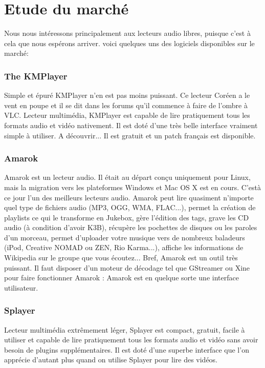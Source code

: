 \documentclass[12pt,a4paper]{report}
\begin{document}
\section{Etude du marché}
Nous nous intéressons principalement aux lecteurs audio libres, puisque c'est à cela que nous espérons arriver. voici quelques uns des logiciels disponibles sur le marché:

\subsubsection{The KMPlayer}

Simple et épuré KMPlayer n'en est pas moins puissant. Ce lecteur Coréen a le vent en poupe et il se dit dans les forums qu'il commence à faire de l'ombre à VLC. Lecteur multimédia, KMPlayer est capable de lire pratiquement tous les formats audio et vidéo nativement. Il est doté d'une très belle interface vraiment simple à  utiliser. A découvrir... Il est gratuit et un patch français est disponible.

\subsubsection{Amarok}

Amarok est un lecteur audio. Il était au départ conçu uniquement pour Linux, mais la migration vers les plateformes Windows et Mac OS X est en cours. C'est\`a ce jour l'un des meilleurs lecteurs audio. 
 Amarok peut lire quasiment n'importe quel type de fichiers audio (MP3, OGG, WMA, FLAC...), permet la création de playlists ce qui le transforme en Jukebox, gère l'édition des tags, grave les CD audio (à condition d'avoir K3B), récupère les pochettes de disques ou les paroles d'un morceau, permet d'uploader votre musique vers de nombreux baladeurs (iPod, Creative NOMAD ou ZEN, Rio Karma...), affiche les informations de Wikipedia sur le groupe que vous écoutez... Bref, Amarok est un outil très puissant.
Il faut disposer d'un moteur de décodage tel que GStreamer ou Xine pour faire fonctionner Amarok : Amarok est en quelque sorte une interface utilisateur. 

\subsubsection{Splayer}

Lecteur multimédia extrêmement léger, Splayer est compact, gratuit, facile à utiliser et capable de lire pratiquement tous les formats audio et vidéo sans avoir besoin de plugins supplémentaires. Il est doté d'une superbe interface que l'on apprécie d'autant plus quand on utilise Splayer pour lire des vidéos. 
\end{document}
